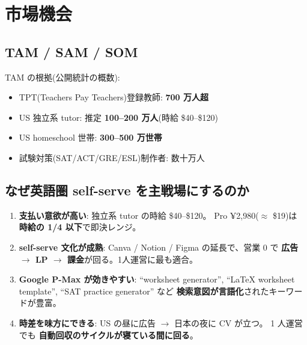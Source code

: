 \documentclass{article}
\newcommand{\hl}[1]{\textcolor{cAlert}{\textbf{#1}}}
\begin{document}
\section{市場機会}

\subsection*{TAM / SAM / SOM}

\begin{center}
\end{center}

\noindent
TAM の根拠(公開統計の概数):
\begin{itemize}[leftmargin=1.4em,itemsep=2pt]
  \item TPT(Teachers Pay Teachers)登録教師: \textbf{700 万人超}
  \item US 独立系 tutor: 推定 \textbf{100--200 万人}(時給 \$40--\$120)
  \item US homeschool 世帯: \textbf{300--500 万世帯}
  \item 試験対策(SAT/ACT/GRE/ESL)制作者: 数十万人
\end{itemize}

\subsection*{なぜ英語圏 self-serve を主戦場にするのか}
\begin{enumerate}[leftmargin=1.4em,itemsep=3pt]
  \item \hl{支払い意欲が高い}: 独立系 tutor の時給 \$40--\$120。
        Pro ¥2,980($\approx$ \$19)は \textbf{時給の 1/4 以下}で即決レンジ。
  \item \hl{self-serve 文化が成熟}: Canva / Notion / Figma の延長で、営業 0 で
        \textbf{広告 $\to$ LP $\to$ 課金}が回る。1人運営に最も適合。
  \item \hl{Google P-Max が効きやすい}: ``worksheet generator'',
        ``LaTeX worksheet template'', ``SAT practice generator'' など
        \textbf{検索意図が言語化}されたキーワードが豊富。
  \item \hl{時差を味方にできる}: US の昼に広告 $\to$ 日本の夜に CV が立つ。
        1 人運営でも \textbf{自動回収のサイクルが寝ている間に回る}。
\end{enumerate}
\end{document}
